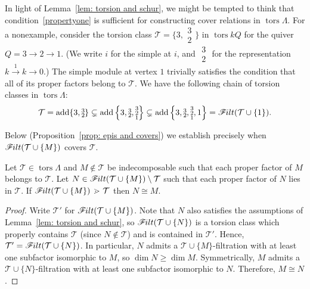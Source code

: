 \documentclass[ALCO,ThmDefs,Unicode,epreuves]{cedram}
\DeclareMathOperator{\tors}{tors}
\DeclareMathOperator{\add}{add}
\newcommand{\calT}{\mathcal{T}}
\newcommand{\filt}{\mathscr{F}\Mk ilt}
\newcommand{\covers}{{\,\,\,\cdot\!\!\!\! >\,\,}}
\renewcommand{\1}{\hat{1}}
\newcommand{\0}{\hat{0}}
\newcommand*{\Mk}{\mkern -2mu}
\begin{document}
\begin{example}\label{noncover}
\normalfont
In light of Lemma~\ref{lem: torsion and schur}, we might be tempted to think that condition~\ref{propertyone} is sufficient for constructing cover relations in $\tors \Lambda$.
For a nonexample, consider the torsion class $\calT = \{3, \substack{3\\2}\}$ in $\tors kQ$ for the quiver $Q= 3\longrightarrow 2 \longrightarrow 1$.
(We write $i$ for the simple at $i$, and $\substack{3\\2}$ for the representation $k\overset{1}{\longrightarrow}k \longrightarrow 0$.)
The simple module at vertex $1$ trivially satisfies the condition that all of its proper factors belong to $\calT$.
We have the following chain of torsion classes in $\tors \Lambda$:
$$\calT = \add\{3, \substack{3\\2}\} \subsetneq \add\left\{3, \substack{3\\2}, \substack{3\\2\\1} \right\}\subsetneq \add\left\{3, \substack{3\\2}, \substack{3\\2\\1}, 1 \right\} = \filt(\calT\cup \{1\}).$$
\end{example}

Below (Proposition~\ref{prop: epis and covers}) we establish precisely when $\filt(\calT\cup \{M\})$ covers $\calT$.

\begin{lemma}\label{uniqueness}
Let $\calT\in \tors\Lambda$ and $M\not\in \calT$ be indecomposable such that each proper factor of $M$ belongs to $\calT$.
Let $N\in \filt(\calT \cup \{M\})\setminus \calT$ such that each proper factor of $N$ lies in $\calT$.
If $\filt(\calT \cup \{M\})\covers \calT$ then $N\cong M$.
 
\end{lemma}
\begin{proof}
Write $\calT'$ for $\filt(\calT \cup \{M\})$.
Note that $N$ also satisfies the assumptions of Lemma~\ref{lem:
 torsion and schur}, so $\filt(\calT \cup \{N\})$ is a torsion class
which properly contains $\calT$ (since $N\notin \calT$) and is
contained in $\calT'$.
Hence, $\calT'=\filt(\calT \cup \{N\})$. 
In particular, $N$ admits a $\calT \cup \{M\}$-filtration with at
least one subfactor isomorphic to $M$, so $\dim N \geq \dim M$. 
Symmetrically, $M$ admits a $\calT \cup \{N\}$-filtration with at
least one subfactor isomorphic to $N$.
Therefore, $M\cong N$. 
\end{proof}
\end{document}
